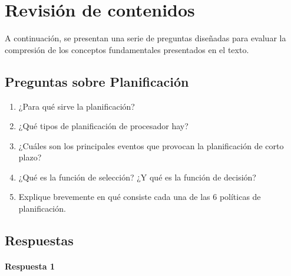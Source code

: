 \section{Revisión de contenidos}

A continuación, se presentan una serie de preguntas diseñadas para evaluar la compresión de los conceptos fundamentales presentados en el texto.

\subsection{Preguntas sobre Planificación}

\begin{enumerate}
  \item ¿Para qué sirve la planificación?
  \item ¿Qué tipos de planificación de procesador hay?
  \item ¿Cuáles son los principales eventos que provocan la planificación de corto plazo?
  \item ¿Qué es la función de selección? ¿Y qué es la función de decisión?
  \item Explique brevemente en qué consiste cada una de las 6 políticas de planificación.
\end{enumerate}

\subsection*{Respuestas}

\paragraph{Respuesta 1} 
